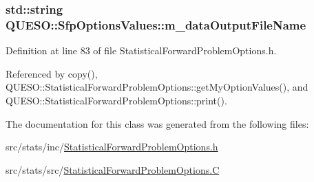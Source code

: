\hypertarget{class_q_u_e_s_o_1_1_sfp_options_values_ad6028c5dff00b18d5085045c3a6d135e}{
\subsubsection[{m\-\_\-data\-Output\-File\-Name}]{\setlength{\rightskip}{0pt plus 5cm}std\-::string Q\-U\-E\-S\-O\-::\-Sfp\-Options\-Values\-::m\-\_\-data\-Output\-File\-Name}}\label{class_q_u_e_s_o_1_1_sfp_options_values_ad6028c5dff00b18d5085045c3a6d135e}


Definition at line 83 of file Statistical\-Forward\-Problem\-Options.\-h.



Referenced by copy(), Q\-U\-E\-S\-O\-::\-Statistical\-Forward\-Problem\-Options\-::get\-My\-Option\-Values(), and Q\-U\-E\-S\-O\-::\-Statistical\-Forward\-Problem\-Options\-::print().



The documentation for this class was generated from the following files\-:\begin{DoxyCompactItemize}
\item 
src/stats/inc/\hyperlink{_statistical_forward_problem_options_8h}{Statistical\-Forward\-Problem\-Options.\-h}\item 
src/stats/src/\hyperlink{_statistical_forward_problem_options_8_c}{Statistical\-Forward\-Problem\-Options.\-C}\end{DoxyCompactItemize}
